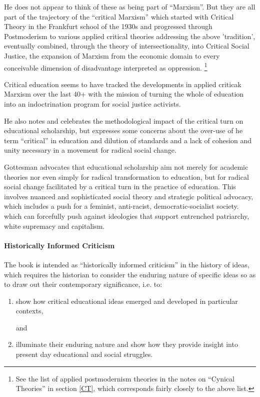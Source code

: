 \documentclass[10pt,titlepage]{book}
\begin{document}
He does not appear to think of these as being part of ``Marxism''.
But they are all part of the trajectory of the ``critical Marxism'' which started with Critical Theory in the Frankfurt school of the 1930s and progressed through Postmoderism to various applied critical theories addressing the above 'tradition', eventually combined, through the theory of intersectionality, into Critical Social Justice, the expansion of Marxism from the economic domain to every conceivable dimension of disadvantage interpreted as oppression.%
\footnote{See the list of applied postmodernism theories in the notes on ``Cynical Theories'' in section \ref{CT}, which corresponds fairly closely to the above list.}

Critical education seems to have tracked the developments in applied criticak Marxism over the last 40+ with the mission of turning the whole of education into an indoctrination program for social justice activists.

He also notes and celebrates the methodological impact of the critical turn on educational scholarship, but expresses some concerns about the over-use of he term ``critical'' in education and dilution of standards and a lack of cohesion and unity necessary in a movement for radical social change.

Gottesman advocates that educational scholarship aim not merely for academic theories nor even simply for radical transformation to education, but for radical social change facilitated by a critical turn in the practice of education.
This involves nuanced and sophisticated social theory and strategic political advocacy,  which includes a push for a feminist, anti-racist, democratic-socialist society. which can forcefully push against ideologies that support entrenched patriarchy, white supremacy and capitalism.

\paragraph{Historically Informed Criticism}

The book is intended as ``historically informed criticism'' in the history of ideas, which requires the historian to consider the enduring nature of specific ideas so as to draw out their contemporary significance, i.e. to:

\begin{enumerate}
\item show how critical educational ideas emerged and developed in particular contexts,

  and
  
\item illuminate their enduring nature and show how they provide insight into present day educational and social struggles.
  
\end{enumerate}
\end{document}

